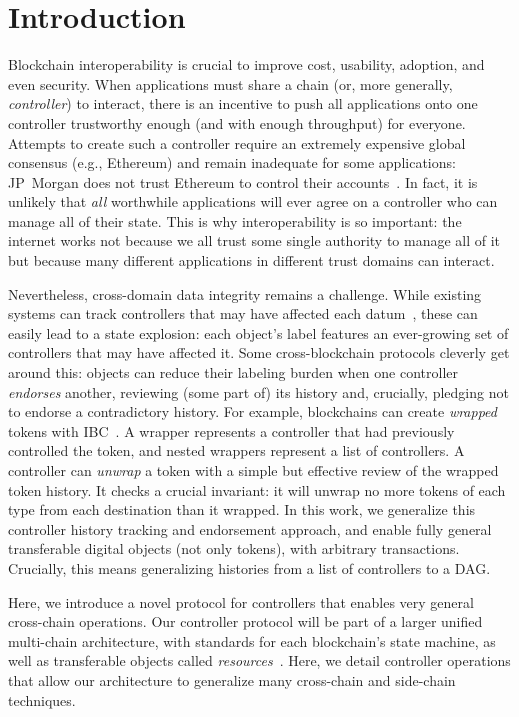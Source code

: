 \documentclass[a4paper,USenglish,cleveref, autoref, thm-restate, anonymous]{lipics-v2021}
\begin{document}
\section{Introduction}
Blockchain interoperability is crucial to improve cost, usability, adoption, and even security. 
When applications must share a chain (or, more generally, \emph{controller}) to interact, there is an incentive to push all applications onto one controller trustworthy enough (and with enough throughput) for everyone. 
Attempts to create such a controller require an extremely expensive global consensus (e.g., Ethereum) and remain inadequate for some applications: JP~Morgan does not trust Ethereum to control their accounts~\cite{onyx}.
In fact, it is unlikely that \emph{all} worthwhile applications will ever agree on a controller who can manage all of their state.
This is why interoperability is so important: the internet works not because we all trust some single authority to manage all of it but because many different applications in different trust domains can interact. 

Nevertheless, cross-domain data integrity remains a challenge.
While  existing systems can track controllers that may have affected each datum~\cite{dista,fabric}, these can easily lead to a state explosion: each object's label features an ever-growing set of controllers that may have affected it. 
Some cross-blockchain protocols cleverly get around this: objects can reduce their labeling burden when one controller \emph{endorses} another, reviewing (some part of) its history and, crucially, pledging not to endorse a contradictory history.
For example, blockchains can create \emph{wrapped} tokens with IBC~\cite{wrapped,ibc}. 
A wrapper represents a controller that had previously controlled the token, and nested wrappers represent a list of controllers. 
A controller can \emph{unwrap} a token with a simple but effective review of the wrapped token history. 
It checks a crucial invariant: it will unwrap no more tokens of each type from each destination than it wrapped. 
In this work, we generalize this controller history tracking and endorsement approach, and enable fully general transferable digital objects (not only tokens), with arbitrary transactions. 
Crucially, this means generalizing histories from a list of controllers to a DAG.

Here, we introduce a novel protocol for controllers that enables very general cross-chain operations.
Our controller protocol will be part of a larger unified multi-chain architecture, with standards for each blockchain's state machine, as well as transferable objects called \emph{resources}~\cite{resource}.
Here, we detail controller operations that allow our architecture to generalize many cross-chain and side-chain techniques. 
\end{document}
